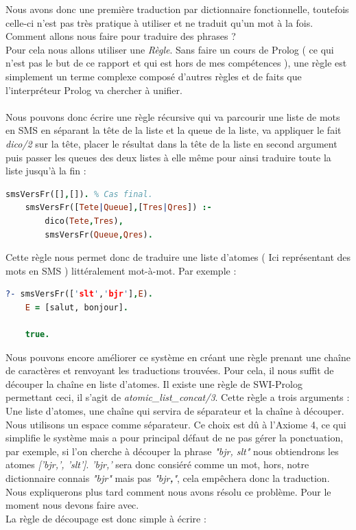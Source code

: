\documentclass[11pt]{report}
\begin{document}
	Nous avons donc une première traduction par dictionnaire fonctionnelle, toutefois celle-ci n'est pas très pratique à utiliser et ne traduit qu'un mot à la fois. Comment allons nous faire pour traduire des phrases ?\\
	Pour cela nous allons utiliser une {\em Règle}. Sans faire un cours de Prolog ( ce qui n'est pas le but de ce rapport et qui est hors de mes compétences ), une règle est simplement un terme complexe composé d'autres règles et de faits que l’interpréteur Prolog va chercher à unifier.
	\paragraph{}
	Nous pouvons donc écrire une règle récursive qui va parcourir une liste de mots en SMS en séparant la tête de la liste et la queue de la liste, va appliquer le fait {\em dico/2} sur la tête, placer le résultat dans la tête de la liste en second argument puis passer les queues des deux listes à elle même pour ainsi traduire toute la liste jusqu'à la fin :
	
	\begin{lstlisting}[language=Prolog]
	smsVersFr([],[]). % Cas final.
	smsVersFr([Tete|Queue],[Tres|Qres]) :-
		dico(Tete,Tres),  
		smsVersFr(Queue,Qres).
	\end{lstlisting}
	
	Cette règle nous permet donc de traduire une liste d'atomes ( Ici représentant des mots en SMS ) littéralement mot-à-mot. Par exemple :
	
	\begin{lstlisting}[language=Prolog]
	?- smsVersFr(['slt','bjr'],E). 
	E = [salut, bonjour].
	
	true.
	\end{lstlisting}
	
	Nous pouvons encore améliorer ce système en créant une règle prenant une chaîne de caractères et renvoyant les traductions trouvées. Pour cela, il nous suffit de découper la chaîne en liste d'atomes. Il existe une règle de SWI-Prolog permettant ceci, il s'agit de {\em atomic\_list\_concat/3}. Cette règle a trois arguments : Une liste d'atomes, une chaîne qui servira de séparateur et la chaîne à découper. Nous utilisons un espace comme séparateur. Ce choix est dû à l'Axiome 4, ce qui simplifie le système mais a pour principal défaut de ne pas gérer la ponctuation, par exemple, si l'on cherche à découper la phrase {\em "bjr, slt"} nous obtiendrons les atomes {\em ['bjr,', 'slt']}. {\em 'bjr,'} sera donc consiéré comme un mot, hors, notre dictionnaire connais {\em "bjr"} mais pas {\em "bjr\textbf{,}"}, cela empêchera donc la traduction. Nous expliquerons plus tard comment nous avons résolu ce problème. Pour le moment nous devons faire avec.\\
	La règle de découpage est donc simple à écrire :
	
\end{document}
